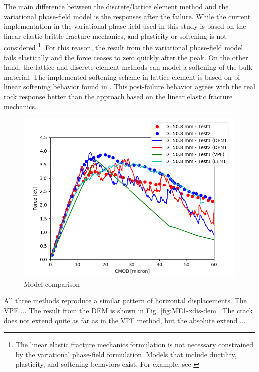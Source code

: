 The main difference between the discrete/lattice element method and the variational phase-field model is the responses after the failure.
While the current implementation in the variational phase-field used in this study is based on the linear elastic brittle fracture mechanics, and plasticity or softening is not 
considered \footnote{The linear elastic fracture mechanics formulation is not necessary constrained by the variational phase-field formulation. Models that include ductility, plasticity, 
and softening behaviors exist. For example, see \cite{Alessi2018}}.
For this reason, the result from the variational phase-field model fails elastically and the force ceases to zero quickly after the peak.
On the other hand, the lattice and discrete element methods can model a softening of the bulk material. The implemented softening 
scheme in lattice element is based on bi-linear softening behavior found in \cite{Inceetal2003}.
This post-failure behavior agrees with the real rock response better than the approach based on the linear elastic fracture mechanics.

\begin{figure}[!ht]
\centering
\includegraphics[width=1\textwidth]{figures/ME1_comp_updated.png}
\caption{Model comparison}
\label{fig:ME1_comparison}
\end{figure}

All three methods reproduce a similar pattern of horizontal displacements. The VPF ... The result from the DEM is shown in Fig. \ref{fig:ME1-xdis-dem}. 
The crack does not extend quite as far as in the VPF method, but the absolute extend ... 

